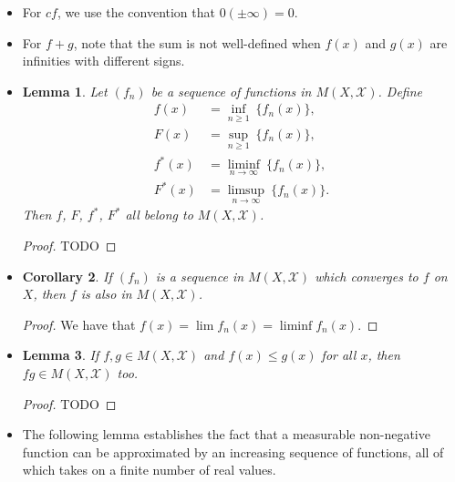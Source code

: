 \documentclass[10pt]{article}
\newtheorem{lemma}{Lemma}
\newtheorem{corollary}[lemma]{Corollary}
\newcommand{\mcal}[1]{\mathcal{#1}}
\begin{document}
\begin{itemize}
  \item For $cf$, we use the convention that $0(\pm\infty) = 0$.
  
  \item For $f+g$, note that the sum is not well-defined when $f(x)$ and $g(x)$ are infinities with different signs.
  
  \item \begin{lemma}
  Let $(f_n)$ be a sequence of functions in $M(X, \mcal{X})$. Define
  \begin{align*}
    f(x) &= \inf_{n \geq 1}\ \{ f_n(x) \}, \\
    F(x) &= \sup_{n \geq 1}\ \{ f_n(x) \}, \\
    f^*(x) &= \liminf_{n \rightarrow \infty}\ \{ f_n(x) \}, \\
    F^*(x) &= \limsup_{n \rightarrow \infty}\ \{ f_n(x) \}.
  \end{align*}
  Then $f$, $F$, $f^*$, $F^*$ all belong to $M(X, \mcal{X})$.
  \end{lemma}

  \begin{proof}
    TODO
  \end{proof}

  \item \begin{corollary}
    If $(f_n)$ is a sequence in $M(X, \mcal{X})$ which converges to $f$ on $X$, then $f$ is also in $M(X, \mcal{X})$.
  \end{corollary}

  \begin{proof}
    We have that $f(x) = \lim f_n(x) = \liminf f_n(x)$.
  \end{proof}

  \item \begin{lemma} \label{lemma:integral-is-monotone}
    If $f, g \in M(X, \mcal{X})$ and $f(x) \leq g(x)$ for all $x$, then $fg \in M(X, \mcal{X})$ too.
  \end{lemma}

  \begin{proof}
    TODO
  \end{proof}

  \item The following lemma establishes the fact that a measurable non-negative function can be approximated by an increasing sequence of functions, all of which takes on a finite number of real values.
  

\end{itemize}
\end{document}
